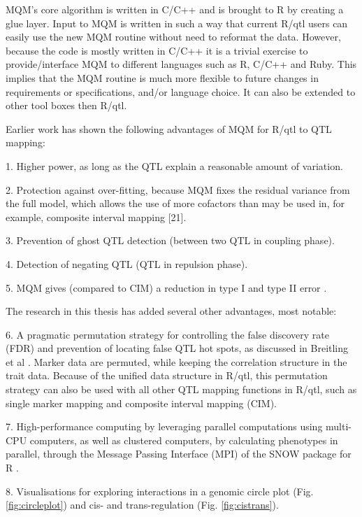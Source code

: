 MQM’s core algorithm is written in C/C++ and is brought to R by creating a glue layer. Input to MQM is written in such a way that current 
R/qtl users can easily use the new MQM routine without need to reformat the data. However, because the code is mostly written in C/C++  
it is a trivial exercise to provide/interface MQM to different languages such as R, C/C++ and Ruby. This implies that the MQM routine is 
much more flexible to future changes in requirements or specifications, and/or language choice. It can also be extended to other tool 
boxes then R/qtl.

Earlier work has shown the following advantages of MQM for R/qtl to QTL mapping\cite{Jansen:1993, Handbook:Jansen:2007}: 

1. Higher power, as long as the QTL explain a reasonable amount of variation.

2. Protection against over-fitting, because MQM fixes the residual variance from the full model, which allows the use of more cofactors than may be used in, for example, composite interval mapping [21].

3. Prevention of ghost QTL detection (between two QTL in coupling phase).

4. Detection of negating QTL (QTL in repulsion phase).

5. MQM gives (compared to CIM) a reduction in type I and type II error  \cite{Handbook:Jansen:2007}.

The research in this thesis has added several other advantages, most notable:

6. A pragmatic permutation strategy for controlling the false discovery rate (FDR) and prevention of locating false QTL hot 
spots, as discussed in Breitling et al \cite{Breitling:2008a}. Marker data are permuted, while keeping the correlation structure in the trait 
data. Because of the unified data structure in R/qtl, this permutation strategy can also be used with all other QTL mapping 
functions in R/qtl, such as single marker mapping and composite interval mapping (CIM).

7. High-performance computing by leveraging parallel computations using multi-CPU computers, as well as clustered computers, 
by calculating phenotypes in parallel, through the Message Passing Interface (MPI) of the SNOW package for R \cite{Tierney:2009}.

8. Visualisations for exploring interactions in a genomic circle plot (Fig. \ref{fig:circleplot}) and cis- and trans-regulation (Fig. \ref{fig:cistrans}).


